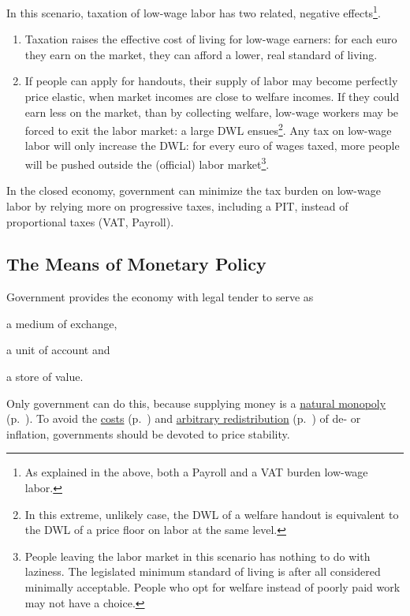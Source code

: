 In this scenario, taxation of low-wage labor has two related, negative effects\footnote{
	As explained in the above, both a \gls{Payroll} and a \gls{VAT} burden low-wage labor.}. 
\begin{enumerate}
	\item Taxation raises the effective cost of living for low-wage earners: for each euro they earn on the market, they can afford a lower, real standard of living. 
	\item If people can apply for handouts, their supply of labor may become perfectly price elastic, when market incomes are close to welfare incomes. If they could earn less on the market, than by collecting welfare, low-wage workers may be forced to exit the labor market: a large \gls{DWL} ensues\footnote{
		In this extreme, unlikely case, the \gls{DWL} of a welfare handout is equivalent to the \gls{DWL} of a price floor on labor at the same level.}. 
	Any tax on low-wage labor will only increase the \gls{DWL}: for every euro of wages taxed, more people will be pushed outside the (official) labor market\footnote{
		People leaving the labor market in this scenario has nothing to do with laziness. The legislated minimum standard of living is after all considered minimally acceptable. People who opt for welfare instead of poorly paid work may not have a choice.}. 
\end{enumerate}

In the closed economy, government can minimize the tax burden on low-wage labor by relying more on progressive taxes, including a \gls{PIT}, instead of proportional taxes (\gls{VAT}, \gls{Payroll}).


\subsection[Monetary Policy]{The Means of Monetary Policy} \label{sec:monetary}
Government provides the economy with legal tender to serve as \begin{inparaenum}[1)] 
	\item a medium of exchange, 
	\item a unit of account and 
	\item a store of value. 
\end{inparaenum} 
Only government can do this, because supplying money is a \hyperref[sec:natural-monopoly]{natural monopoly} (p.~\pageref{sec:natural-monopoly}). To avoid the \hyperref[sec:price-stability]{costs} (p.~\pageref{sec:price-stability}) and  \hyperref[sec:distributive-effects-of-inflation]{arbitrary redistribution} (p.~\pageref{sec:distributive-effects-of-inflation}) of de- or inflation, 
governments should be devoted to price stability. 

